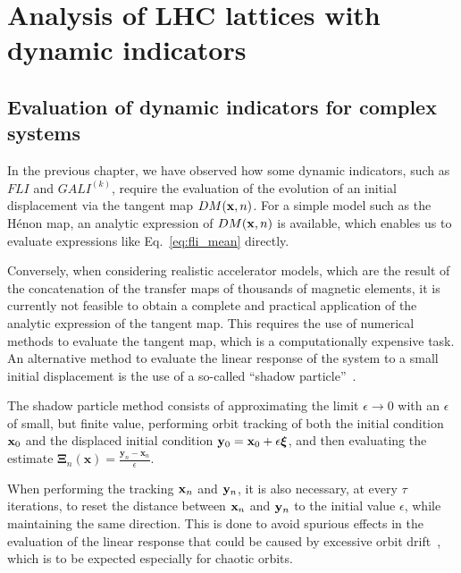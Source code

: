 \chapter{Analysis of LHC lattices with dynamic indicators}

\section{Evaluation of dynamic indicators for complex systems}

In the previous chapter, we have observed how some dynamic indicators, such as $FLI$ and $GALI^{(k)}$, require the evaluation of the evolution of an initial displacement via the tangent map $DM(\vb{x}, n)$. For a simple model such as the Hénon map, an analytic expression of $DM(\vb{x}, n)$ is available, which enables us to evaluate expressions like Eq.~\ref{eq:fli_mean} directly.

Conversely, when considering realistic accelerator models, which are the result of the concatenation of the transfer maps of thousands of magnetic elements, it is currently not feasible to obtain a complete and practical application of the analytic expression of the tangent map. This requires the use of numerical methods to evaluate the tangent map, which is a computationally expensive task. An alternative method to evaluate the linear response of the system to a small initial displacement is the use of a so-called ``shadow particle''~\cite{Skokos2010b}.

The shadow particle method consists of approximating the limit $\epsilon\to 0$ with an $\epsilon$ of small, but finite value, performing orbit tracking of both the initial condition $\vb{x}_0$ and the displaced initial condition $\vb{y}_0 = \vb{x}_0 + \epsilon \boldsymbol{\xi}$, and then evaluating the estimate $\boldsymbol{\Xi}_{n}(\mathbf{x})=\frac{\mathbf{y}_{n}-\mathbf{x}_{n}}{\epsilon}$.

When performing the tracking $\vb{x}_n$ and $\vb{y}_n$, it is also necessary, at every $\tau$ iterations, to reset the distance between $\vb{x}_n$ and $\vb{y}_n$ to the initial value $\epsilon$, while maintaining the same direction. This is done to avoid spurious effects in the evaluation of the linear response that could be caused by excessive orbit drift~\cite{Skokos2010b}, which is to be expected especially for chaotic orbits.


